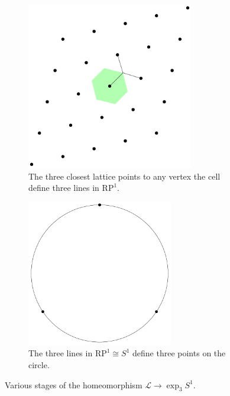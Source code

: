 \documentclass[12pt,twoside]{reedthesis}
\theoremstyle{definition}
\newcommand{\LS}{\mathcal{L}}
\newcommand{\RP}{\mathrm{RP}^1}
\begin{document}
\begin{figure}[h]
\begin{subfigure}[t]{0.45\textwidth}
    \includegraphics[width=0.8\textwidth]{figures/subset_homeomorphism_step_3.pdf}
    \caption{The three closest lattice points to any vertex the cell define three lines in $\RP$.}
  \end{subfigure}
  \hfill
  \begin{subfigure}[t]{0.45\textwidth}
    \centering
    \includegraphics[width=0.7\textwidth]{figures/subset_homeomorphism_step_4.pdf}
    \caption{The three lines in $\RP \cong S^1$ define three points on the circle.}
  \end{subfigure}
  \caption{Various stages of the homeomorphism $\LS \to \exp_3 S^1$.}
  \label{fig:homeomorphism_to_subset}
\end{figure}
\end{document}
